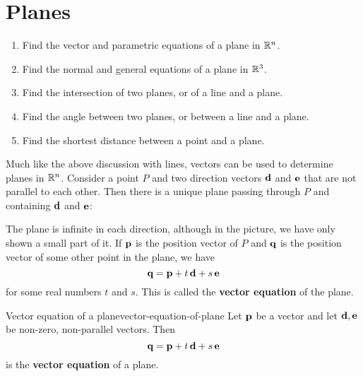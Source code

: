 \section{Planes}

\begin{outcome}
  \begin{enumerate}
  \item Find the vector and parametric equations of a plane in $\mathbb{R}^n$.
  \item Find the normal and general equations of a plane in $\mathbb{R}^3$.
  \item Find the intersection of two planes, or of a line and a plane.
  \item Find the angle between two planes, or between a line and a plane.
  \item Find the shortest distance between a point and a plane.
  \end{enumerate}
\end{outcome}

Much like the above discussion with lines, vectors can be used to
determine planes in $\mathbb{R}^n$. Consider a point $P$ and two direction
vectors $\mbox{\bf d}$ and $\mbox{\bf e}$ that are not parallel to each
other. Then there is a unique plane passing through $P$ and containing
$\mbox{\bf d}$ and $\mbox{\bf e}$:
\begin{center}
\end{center}
The plane is infinite in each direction, although in the picture, we
have only shown a small part of it. If $\mbox{\bf p}$ is the position
vector of $P$ and $\mbox{\bf q}$ is the position vector of some other
point in the plane, we have
\begin{equation*}
  \mbox{\bf q} = \mbox{\bf p} + t\,\mbox{\bf d} + s\,\mbox{\bf e}
\end{equation*}
for some real numbers $t$ and $s$. This is called the \textbf{vector
  equation}%
 of the
plane.

\begin{definition}{Vector equation of a plane}{vector-equation-of-plane}
  Let $\mbox{\bf p}$ be a vector and let $\mbox{\bf d},\mbox{\bf e}$ be non-zero,
  non-parallel vectors. Then
  \begin{equation*}
    \mbox{\bf q} = \mbox{\bf p} + t\,\mbox{\bf d} + s\,\mbox{\bf e}
  \end{equation*}
  is the \textbf{vector equation}%
   of a
  plane.
\end{definition}

